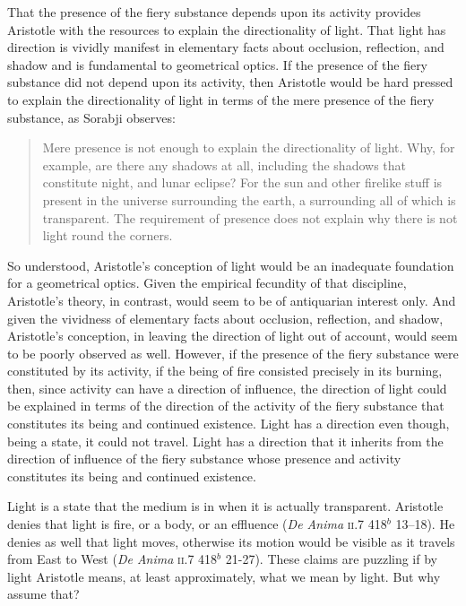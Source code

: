 That the presence of the fiery substance depends upon its activity provides Aristotle with the resources to explain the directionality of light. That light has direction is vividly manifest in elementary facts about occlusion, reflection, and shadow and is fundamental to geometrical optics. If the presence of the fiery substance did not depend upon its activity, then Aristotle would be hard pressed to explain the directionality of light in terms of the mere presence of the fiery substance, as Sorabji observes: 
\begin{quote}
	Mere presence is not enough to explain the directionality of light. Why, for example, are there any shadows at all, including the shadows that constitute night, and lunar eclipse? For the sun and other firelike stuff is present in the universe surrounding the earth, a surrounding all of which is transparent. The requirement of presence does not explain why there is not light round the corners. \citep[132]{Sorabji:2004fk}
\end{quote}
So understood, Aristotle's conception of light would be an inadequate foundation for a geometrical optics. Given the empirical fecundity of that discipline, Aristotle's theory, in contrast, would seem to be of antiquarian interest only. And given the vividness of elementary facts about occlusion, reflection, and shadow, Aristotle's conception, in leaving the direction of light out of account, would seem to be poorly observed as well. However, if the presence of the fiery substance were constituted by its activity, if the being of fire consisted precisely in its burning, then, since activity can have a direction of influence, the direction of light could be explained in terms of the direction of the activity of the fiery substance that constitutes its being and continued existence. Light has a direction even though, being a state, it could not travel. Light has a direction that it inherits from the direction of influence of the fiery substance whose presence and activity constitutes its being and continued existence.

Light is a state that the medium is in when it is actually transparent. Aristotle denies that light is fire, or a body, or an effluence (\emph{De Anima} \textsc{ii}.7 418\( ^{b} \) 13--18). He denies as well that light moves, otherwise its motion would be visible as it travels from East to West (\emph{De Anima} \textsc{ii}.7 418\( ^{b} \) 21-27). These claims are puzzling if by light Aristotle means, at least approximately, what we mean by light. But why assume that? 

